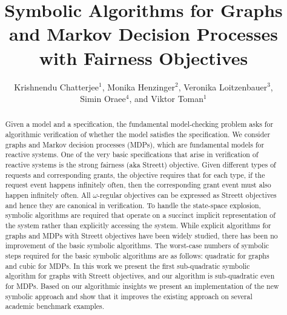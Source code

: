 \documentclass[a4paper,envcountsame]{llncs}
\begin{document}
\mainmatter

\title{Symbolic Algorithms for Graphs and Markov Decision Processes with Fairness Objectives\vspace{-2mm}}
\author{Krishnendu Chatterjee$^1$, Monika Henzinger$^2$, Veronika Loitzenbauer$^3$, \\ Simin Oraee$^4$, and Viktor Toman$^1$\vspace{-1mm}}

\maketitle
\vspace{-4mm}
\begin{abstract}
Given a model and a specification, the fundamental model-checking problem asks
for algorithmic verification of whether the model satisfies the specification.
We consider graphs and Markov decision processes (MDPs), which are fundamental 
models for reactive systems.
One of the very basic specifications that arise in verification of reactive systems
is the strong fairness (aka Streett) objective. Given different types of 
requests and corresponding grants, the objective requires that for each type, if the 
request event happens infinitely often, then the corresponding grant event 
must also happen infinitely often. 
All $\omega$-regular objectives can be expressed as Streett objectives
and hence they are canonical in verification. 
To handle the state-space explosion, symbolic algorithms are required that operate on a
succinct implicit representation of the system rather than explicitly accessing
the system.
While explicit algorithms for graphs and MDPs with Streett objectives have been 
widely studied, there has been no improvement of the basic symbolic algorithms.
The worst-case numbers of symbolic steps required for the basic symbolic algorithms 
are as follows: quadratic for graphs and cubic for MDPs.
In this work we present the first sub-quadratic symbolic algorithm for graphs 
with Streett objectives, and our algorithm is sub-quadratic even for MDPs.
Based on our algorithmic insights we present an implementation of the new symbolic
approach and show that it improves the existing approach on several academic benchmark
examples.
\end{abstract}
\end{document}

